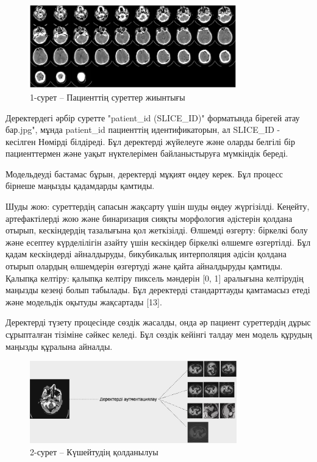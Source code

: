 \begin{figure}[H]
	\centering
	\includegraphics[width=0.8\textwidth]{assets/1}
	\caption*{1-сурет -- Пациенттің суреттер жиынтығы}
\end{figure}

\begin{multicols}{2}
Деректердегі әрбір суретте "patient\_id (SLICE\_ID)" форматында бірегей
атау бар.jpg", мұнда patient\_id пациенттің идентификаторын, ал
SLICE\_ID - кесілген Нөмірді білдіреді. Бұл деректерді жүйелеуге және
оларды белгілі бір пациенттермен және уақыт нүктелерімен байланыстыруға
мүмкіндік береді.

Модельдеуді бастамас бұрын, деректерді мұқият өңдеу керек. Бұл процесс
бірнеше маңызды қадамдарды қамтиды.

Шуды жою: суреттердің сапасын жақсарту үшін шуды өңдеу жүргізілді.
Кеңейту, артефактілерді жою және бинаризация сияқты морфология әдістерін
қолдана отырып, кескіндердің тазалығына қол жеткізілді. Өлшемді өзгерту:
біркелкі болу және есептеу күрделілігін азайту үшін кескіндер біркелкі
өлшемге өзгертілді. Бұл қадам кескіндерді айналдыруды, бикубикалық
интерполяция әдісін қолдана отырып олардың өлшемдерін өзгертуді және
қайта айналдыруды қамтиды. Қалыпқа келтіру: қалыпқа келтіру пиксель
мәндерін {[}0, 1{]} аралығына келтірудің маңызды кезеңі болып табылады.
Бұл деректерді стандарттауды қамтамасыз етеді және модельдік оқытуды
жақсартады {[}13{]}.

Деректерді түзету процесінде сөздік жасалды, онда әр пациент суреттердің
дұрыс сұрыпталған тізіміне сәйкес келеді. Бұл сөздік кейінгі талдау мен
модель құрудың маңызды құралына айналды.
\end{multicols}

\begin{figure}[H]
	\centering
	\includegraphics[width=0.8\textwidth]{assets/2}
	\caption*{2-сурет -- Күшейтудің қолданылуы}
\end{figure}

